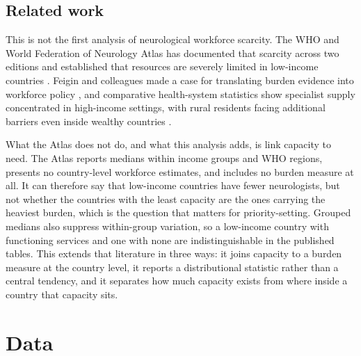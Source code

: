 \documentclass[9pt,twoside]{pnas-new}
\begin{document}

\subsection*{Related work}

This is not the first analysis of neurological
workforce scarcity. The WHO and World Federation of Neurology Atlas has
documented that scarcity across two editions and established that resources are
severely limited in low-income countries \cite{atlas2017}. Feigin and colleagues
made a case for translating burden evidence into workforce policy
\cite{feigin2020}, and comparative health-system statistics show specialist
supply concentrated in high-income settings, with rural residents facing
additional barriers even inside wealthy countries \cite{oecd2023,anand2004}.

What the Atlas does not do, and what this analysis adds, is link capacity to
need. The Atlas reports medians within income groups and WHO regions,
presents no country-level workforce estimates, and includes no burden measure at
all. It can therefore say that low-income countries have fewer neurologists, but
not whether the countries with the least capacity are the ones carrying the
heaviest burden, which is the question that matters for priority-setting.
Grouped medians also suppress within-group variation, so a low-income
country with functioning services and one with none are indistinguishable in the
published tables. This extends that literature in three ways: it joins
capacity to a burden measure at the country level, it reports a distributional
statistic rather than a central tendency, and it separates how much capacity
exists from where inside a country that capacity sits.\Parasplit

%

\section*{Data}
\end{document}
